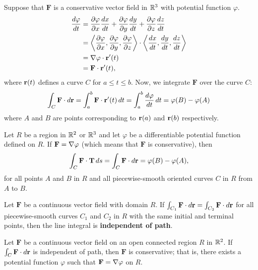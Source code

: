 \documentclass[mathNotesPreamble]{subfiles}
\begin{document}
  \noindent Suppose that $\mathbf F$ is a conservative vector field in $\mathbb{R}^3$ with potential function $\varphi$. 
  \begin{align*}
    \frac{d\varphi}{dt}&= \frac{\partial\varphi}{\partial x}\frac{dx}{dt}+\frac{\partial\varphi}{\partial y}\frac{dy}{dt}+\frac{\partial\varphi}{\partial z}\frac{dz}{dt}\\
      &={\left\langle \frac{\partial \varphi}{\partial x},\frac{\partial \varphi}{\partial y},\frac{\partial \varphi}{\partial z} \right\rangle}\cdot{\left\langle \frac{dx}{dt},\frac{dy}{dt},\frac{dz}{dt} \right\rangle}\\
      &=\nabla\varphi\cdot{\mathbf{r}}'(t)\\
      &=\mathbf F\cdot{\mathbf{r}}'(t),
  \end{align*}
  where ${\mathbf{r}}(t)$ defines a curve $C$ for $a\leq t\leq b$. Now, we integrate $\mathbf F$ over the curve $C$:
  \begin{align*}
    \int_C\mathbf F\cdot d{\mathbf{r}}= \int_a^b \mathbf F\cdot{\mathbf{r}}'(t)\,dt
      =\int_a^b \frac{d\varphi}{dt}\,dt
      =\varphi(B)-\varphi(A)
  \end{align*}
  where $A$ and $B$ are points corresponding to ${\mathbf{r}}(a)$ and ${\mathbf{r}}(b)$ respectively.


  \begin{thmBox*}
    Let $R$ be a region in $\mathbb{R}^2$ or $\mathbb{R}^3$ and let $\varphi$ be a differentiable potential function defined on $R$. If $\mathbf F=\nabla\varphi$ (which means that $\mathbf F$ is conservative), then
       \[\int_C \mathbf F\cdot{\mathbf{T}}\,ds=\int_C \mathbf F\cdot d{\mathbf{r}}=\varphi(B)-\varphi(A),\]
     for all points $A$ and $B$ in $R$ and all piecewise-smooth oriented curves $C$ in $R$ from $A$ to $B$.
  \end{thmBox*}

  \begin{defn*}
    Let $\mathbf F$ be a continuous vector field with domain $R$. If $\int_{C_1} \mathbf F\cdot d{\mathbf{r}}=\int_{C_2} \mathbf F\cdot d{\mathbf{r}}$ for all piecewise-smooth curves $C_1$ and $C_2$ in $R$ with the same initial and terminal points, then the line integral is \textbf{independent of path}.
  \end{defn*}
  \pagebreak

  \begin{thmBox*}[Theorem 17.5]
    Let $\mathbf F$ be a continuous vector field on an open connected region $R$ in $\mathbb{R}^2$. If $\int_C \mathbf F\cdot d{\mathbf{r}}$ is independent of path, then $\mathbf F$ is conservative; that is, there exists a potential function $\varphi$ such that $\mathbf F=\nabla \varphi$ on $R$. 
  \end{thmBox*}
\end{document}
